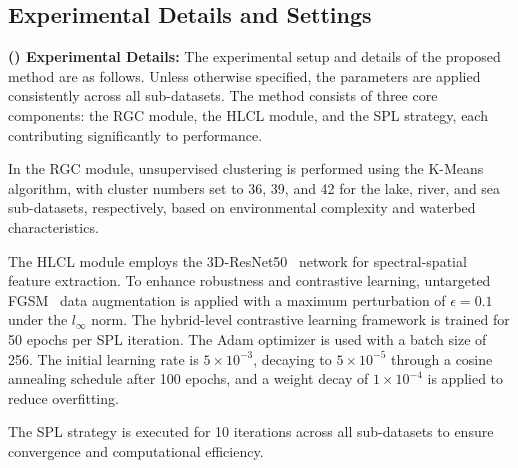 \subsection{Experimental Details and Settings}\label{sec:4.2}
\textbf{() Experimental Details:} 
The experimental setup and details of the proposed method are as follows. Unless otherwise specified, the parameters are applied consistently across all sub-datasets. The method consists of three core components: the RGC module, the HLCL module, and the SPL strategy, each contributing significantly to performance.

In the RGC module, unsupervised clustering is performed using the K-Means~\cite{Sinaga2020} algorithm, with cluster numbers set to 36, 39, and 42 for the lake, river, and sea sub-datasets, respectively, based on environmental complexity and waterbed characteristics.

The HLCL module employs the 3D-ResNet50~\cite{Jiang2019} network for spectral-spatial feature extraction. To enhance robustness and contrastive learning, untargeted FGSM~\cite{GoodfellowSS14} data augmentation is applied with a maximum perturbation of $\epsilon=0.1$ under the $l_{\infty}$ norm. The hybrid-level contrastive learning framework is trained for 50 epochs per SPL iteration. The Adam optimizer is used with a batch size of 256. The initial learning rate is $5\times10^{-3}$, decaying to $5\times10^{-5}$ through a cosine annealing schedule after 100 epochs, and a weight decay of $1\times10^{-4}$ is applied to reduce overfitting.

The SPL strategy is executed for 10 iterations across all sub-datasets to ensure convergence and computational efficiency.

